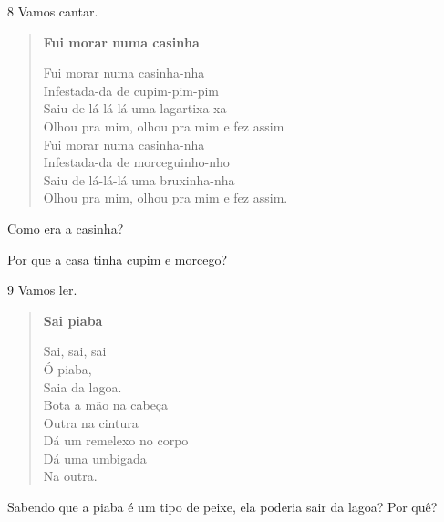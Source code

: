\num{8} Vamos cantar.

\begin{verse}
\textbf{Fui morar numa casinha}

Fui morar numa casinha-nha\\
Infestada-da de cupim-pim-pim\\
Saiu de lá-lá-lá uma lagartixa-xa\\
Olhou pra mim, olhou pra mim e fez assim\\
Fui morar numa casinha-nha\\
Infestada-da de morceguinho-nho\\
Saiu de lá-lá-lá uma bruxinha-nha\\
Olhou pra mim, olhou pra mim e fez assim.
\end{verse}


\begin{escolha}
\item Como era a casinha?


\item Por que a casa tinha cupim e morcego?

\end{escolha}

\num{9} Vamos ler.

\begin{verse}
\textbf{Sai piaba}

Sai, sai, sai\\
Ó piaba,\\
Saia da lagoa.\\
Bota a mão na cabeça\\
Outra na cintura\\
Dá um remelexo no corpo\\
Dá uma umbigada\\
Na outra.
\end{verse}


Sabendo que a piaba é um tipo de peixe, ela poderia sair da lagoa? Por quê?

